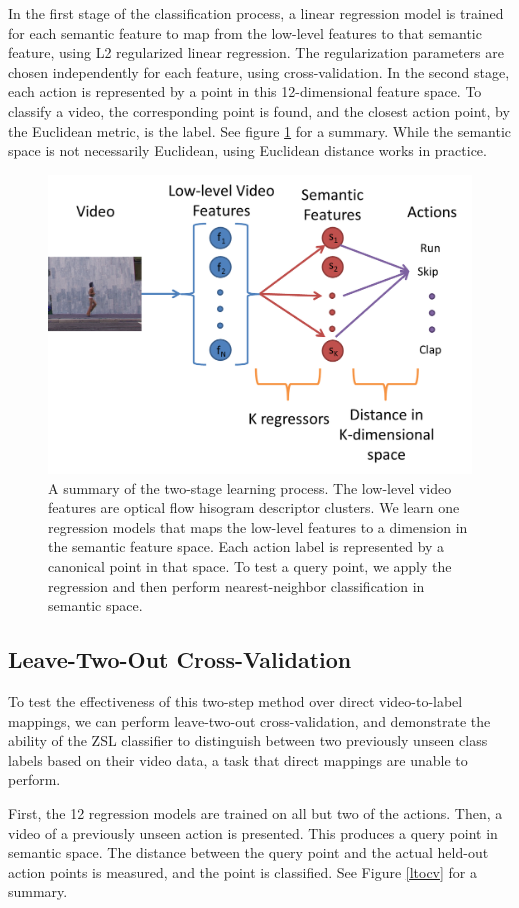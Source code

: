 \documentclass{article}
\begin{document}
In the first stage of the classification process, a linear regression model is trained for each semantic feature to map from the low-level features to that semantic feature, using L2 regularized linear regression. The regularization parameters are chosen independently for each feature, using cross-validation. In the second stage, each action is represented by a point in this 12-dimensional feature space. To classify a video, the corresponding point is found, and the closest action point, by the Euclidean metric, is the label. See figure \ref{2stage} for a summary. While the semantic space is not necessarily Euclidean, using Euclidean distance works in practice.

\begin{figure}[h]
  \centering
  \includegraphics[width=.5\linewidth]{2stagelearning.png}
  \caption{A summary of the two-stage learning process. The low-level video features are optical flow hisogram descriptor clusters. We learn one regression models that maps the low-level features to a dimension in the semantic feature space. Each action label is represented by a canonical point in that space.  To test a query point, we apply the regression and then perform nearest-neighbor classification in semantic space.}
  \label{2stage}
\end{figure}

\subsection{Leave-Two-Out Cross-Validation}
To test the effectiveness of this two-step method over direct video-to-label mappings, we can perform leave-two-out cross-validation, and demonstrate the ability of the ZSL classifier to distinguish between two previously unseen class labels based on their video data, a task that direct mappings are unable to perform.

First, the 12 regression models are trained on all but two of the actions. Then, a video of a previously unseen action is presented. This produces a query point in semantic space. The distance between the query point and the actual held-out action points is measured, and the point is classified. See Figure \ref{ltocv} for a summary.
\end{document}

